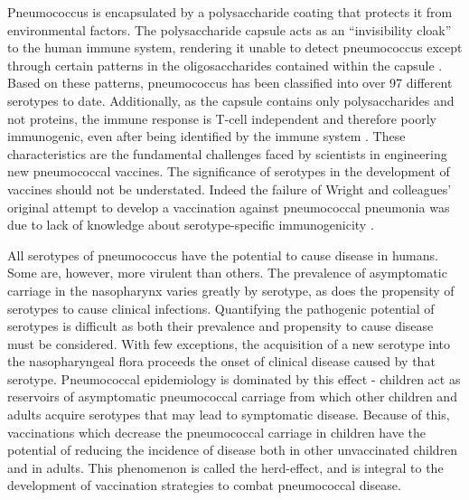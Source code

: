 \documentclass[]{book}
\theoremstyle{definition}
\theoremstyle{definition}
\theoremstyle{definition}
\theoremstyle{remark}
\begin{document}
Pneumococcus is encapsulated by a polysaccharide coating that protects
it from environmental factors. The polysaccharide capsule acts as an
``invisibility cloak'' to the human immune system, rendering it unable
to detect pneumococcus except through certain patterns in the
oligosaccharides contained within the capsule \citep{Epstein1995}. Based
on these patterns, pneumococcus has been classified into over 97
different serotypes to date. Additionally, as the capsule contains only
polysaccharides and not proteins, the immune response is T-cell
independent and therefore poorly immunogenic, even after being
identified by the immune system \citep{Geno2015b}. These characteristics
are the fundamental challenges faced by scientists in engineering new
pneumococcal vaccines. The significance of serotypes in the development
of vaccines should not be understated. Indeed the failure of Wright and
colleagues' original attempt to develop a vaccination against
pneumococcal pneumonia was due to lack of knowledge about
serotype-specific immunogenicity \citep{Wright1914}.

All serotypes of pneumococcus have the potential to cause disease in
humans. Some are, however, more virulent than others. The prevalence of
asymptomatic carriage in the nasopharynx varies greatly by serotype, as
does the propensity of serotypes to cause clinical infections.
Quantifying the pathogenic potential of serotypes is difficult as both
their prevalence and propensity to cause disease must be considered.
With few exceptions, the acquisition of a new serotype into the
nasopharyngeal flora proceeds the onset of clinical disease caused by
that serotype. Pneumococcal epidemiology is dominated by this effect -
children act as reservoirs of asymptomatic pneumococcal carriage from
which other children and adults acquire serotypes that may lead to
symptomatic disease. Because of this, vaccinations which decrease the
pneumococcal carriage in children have the potential of reducing the
incidence of disease both in other unvaccinated children and in adults.
This phenomenon is called the herd-effect, and is integral to the
development of vaccination strategies to combat pneumococcal disease.
\end{document}
